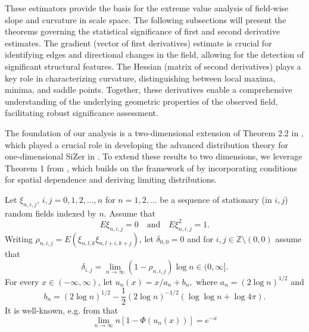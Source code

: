 \documentclass{article}
\begin{document}
These estimators provide the basis for the extreme value analysis of field-wise slope and curvature in scale space. The following subsections will present the theorems governing the statistical significance of first and second derivative estimates. The gradient (vector of first derivatives) estimate is crucial for identifying edges and directional changes in the field, allowing for the detection of significant structural features. The Hessian (matrix of second derivatives) plays a key role in characterizing curvature, distinguishing between local maxima, minima, and saddle points. Together, these derivatives enable a comprehensive understanding of the underlying geometric properties of the observed field, facilitating robust  significance assessment.

The foundation of our analysis is a two-dimensional extension of Theorem 2.2 in \citet{hsing1996extremes}, which played a crucial role in developing the advanced distribution theory for one-dimensional SiZer in \cite{hannig2006advanced}. To extend these results to two dimensions, we leverage Theorem 1 from \citet{french2013asymptotic}, which builds on the framework of \citet{hsing1996extremes} by incorporating conditions for spatial dependence and deriving limiting distributions. 

Let $\xi_{n,i,j}$, $i,j=0,1,2,\ldots,n$ for $n=1,2,\ldots$ be a sequence of stationary (in $i,j$) random fields indexed by $n$. Assume that 
\begin{equation*}
	E\xi_{n,i,j}=0\quad\text{and}\quad E\xi_{n,i,j}^2=1.
\end{equation*}
Writing $\rho_{n,i,j}=E(\xi_{n,l,k}\xi_{n,l+i,k+j})$, let $\delta_{0,0}=0$ and for $i,j \in \mathbb{Z}\setminus (0,0)$ assume that
\begin{equation}
	\label{2d_assp1.2}
	\delta_{i,j}=\lim_{n\rightarrow\infty}(1-\rho_{n,i,j})\log n \in(0,\infty].
\end{equation}
For every $x\in(-\infty,\infty)$, let
$u_n(x)=x/a_n+b_n,$
where 
$
a_n=(2\log n)^{1/2}
$
and
\begin{equation*}
	b_n=(2\log n)^{1/2}-\frac{1}{2}(2\log n)^{-1/2}(\log\log n+\log4\pi).
\end{equation*}
It is well-known, e.g. from \citep{leadbetter2012extremes} that 
\begin{equation*}
	\label{un_approx}
	\lim_{n\rightarrow\infty}n[1-\Phi(u_n(x))]=e^{-x}
\end{equation*}
\end{document}
